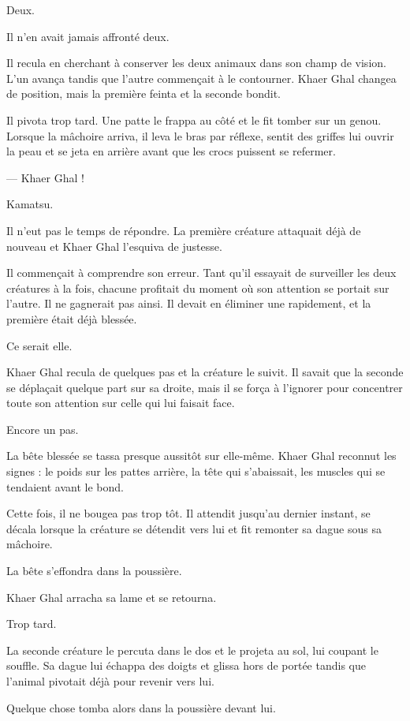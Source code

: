 Deux.

Il n'en avait jamais affronté deux.

Il recula en cherchant à conserver les deux animaux dans son champ de vision.
L'un avança tandis que l'autre commençait à le contourner. Khaer Ghal changea
de position, mais la première feinta et la seconde bondit.

Il pivota trop tard. Une patte le frappa au côté et le fit tomber sur un genou.
Lorsque la mâchoire arriva, il leva le bras par réflexe, sentit des griffes lui
ouvrir la peau et se jeta en arrière avant que les crocs puissent se refermer.

— Khaer Ghal !

Kamatsu.

Il n'eut pas le temps de répondre. La première créature attaquait déjà de
nouveau et Khaer Ghal l'esquiva de justesse.

Il commençait à comprendre son erreur. Tant qu'il essayait de surveiller les
deux créatures à la fois, chacune profitait du moment où son attention se
portait sur l'autre. Il ne gagnerait pas ainsi. Il devait en éliminer une
rapidement, et la première était déjà blessée.

Ce serait elle.

Khaer Ghal recula de quelques pas et la créature le suivit. Il savait que la
seconde se déplaçait quelque part sur sa droite, mais il se força à l'ignorer
pour concentrer toute son attention sur celle qui lui faisait face.

Encore un pas.

La bête blessée se tassa presque aussitôt sur elle-même. Khaer Ghal reconnut
les signes : le poids sur les pattes arrière, la tête qui s'abaissait, les
muscles qui se tendaient avant le bond.

Cette fois, il ne bougea pas trop tôt. Il attendit jusqu'au dernier instant, se
décala lorsque la créature se détendit vers lui et fit remonter sa dague sous
sa mâchoire.

La bête s'effondra dans la poussière.

Khaer Ghal arracha sa lame et se retourna.

Trop tard.

La seconde créature le percuta dans le dos et le projeta au sol, lui coupant le
souffle. Sa dague lui échappa des doigts et glissa hors de portée tandis que
l'animal pivotait déjà pour revenir vers lui.

Quelque chose tomba alors dans la poussière devant lui.


